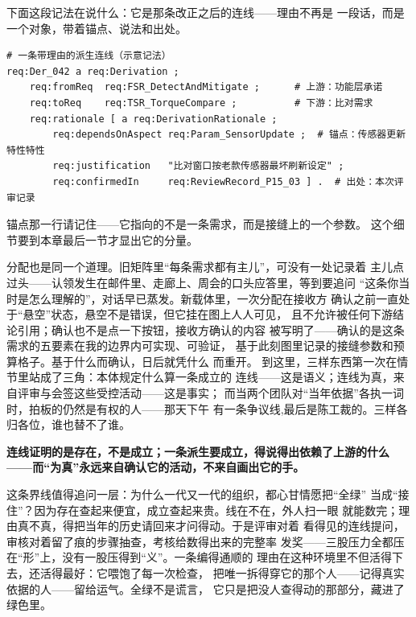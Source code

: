 下面这段记法在说什么：它是那条改正之后的连线——理由不再是
一段话，而是一个对象，带着锚点、说法和出处。

\nopagebreak[4]
\begin{codebox}
\begin{Verbatim}[fontsize=\small,breaklines=true,breakanywhere=true,breaksymbolleft={},breaksymbolright={}]
# 一条带理由的派生连线（示意记法）
req:Der_042 a req:Derivation ;
    req:fromReq  req:FSR_DetectAndMitigate ;      # 上游：功能层承诺
    req:toReq    req:TSR_TorqueCompare ;          # 下游：比对需求
    req:rationale [ a req:DerivationRationale ;
        req:dependsOnAspect req:Param_SensorUpdate ;  # 锚点：传感器更新特性特性
        req:justification   "比对窗口按老款传感器最坏刷新设定" ;
        req:confirmedIn     req:ReviewRecord_P15_03 ] .  # 出处：本次评审记录
\end{Verbatim}
\end{codebox}

锚点那一行请记住——它指向的不是一条需求，而是接缝上的一个参数。
这个细节要到本章最后一节才显出它的分量。

分配也是同一个道理。旧矩阵里“每条需求都有主儿”，可没有一处记录着
主儿点过头——认领发生在邮件里、走廊上、周会的口头应答里，等到要追问
“这条你当时是怎么理解的”，对话早已蒸发。新载体里，一次分配在接收方
确认之前一直处于“悬空”状态，悬空不是错误，但它挂在图上人人可见，
且不允许被任何下游结论引用；确认也不是点一下按钮，接收方确认的内容
被写明了——确认的是这条需求的五要素在我的边界内可实现、可验证，
基于此刻图里记录的接缝参数和预算格子。基于什么而确认，日后就凭什么
而重开。
到这里，三样东西第一次在情节里站成了三角：本体规定什么算一条成立的
连线——这是语义；连线为真，来自评审与会签这些受控活动——这是事实；
而当两个团队对“当年依据”各执一词时，拍板的仍然是有权的人——那天下午
有一条争议线,最后是陈工裁的。三样各归各位，谁也替不了谁。

\textbf{连线证明的是存在，不是成立；一条派生要成立，得说得出依赖了上游的什么——而“为真”永远来自确认它的活动，不来自画出它的手。}

这条界线值得追问一层：为什么一代又一代的组织，都心甘情愿把“全绿”
当成“接住”？因为存在查起来便宜，成立查起来贵。线在不在，外人扫一眼
就能数完；理由真不真，得把当年的历史请回来才问得动。于是评审对着
看得见的连线提问，审核对着留了痕的步骤抽查，考核给数得出来的完整率
发奖——三股压力全都压在“形”上，没有一股压得到“义”。一条编得通顺的
理由在这种环境里不但活得下去，还活得最好：它喂饱了每一次检查，
把唯一拆得穿它的那个人——记得真实依据的人——留给运气。全绿不是谎言，
它只是把没人查得动的那部分，藏进了绿色里。

